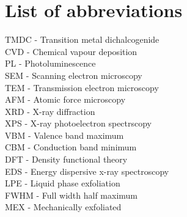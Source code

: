 \section*{List of abbreviations}

TMDC - Transition metal dichalcogenide\\
CVD - Chemical vapour deposition\\
PL - Photoluminescence\\
SEM - Scanning electron microscopy\\
TEM - Transmission electron microscopy\\
AFM - Atomic force microscopy\\
XRD - X-ray diffraction\\
XPS - X-ray photoelectron spectrscopy\\
VBM - Valence band maximum\\
CBM - Conduction band minimum\\
DFT - Density functional theory\\
EDS - Energy dispersive x-ray spectroscopy\\
LPE - Liquid phase exfoliation\\
FWHM - Full width half maximum\\
MEX - Mechanically exfoliated